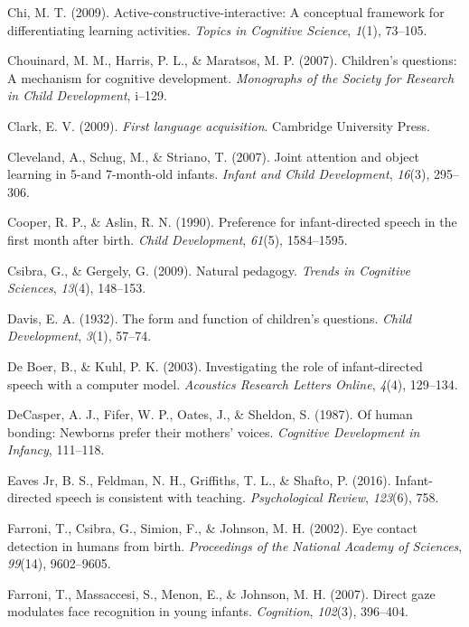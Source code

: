 \documentclass[a4paper,man,apacite,floatsintext]{apa6}
\begin{document}
\hypertarget{ref-chi2009active}{}
Chi, M. T. (2009). Active-constructive-interactive: A conceptual
framework for differentiating learning activities. \emph{Topics in
Cognitive Science}, \emph{1}(1), 73--105.

\hypertarget{ref-chouinard2007children}{}
Chouinard, M. M., Harris, P. L., \& Maratsos, M. P. (2007). Children's
questions: A mechanism for cognitive development. \emph{Monographs of
the Society for Research in Child Development}, i--129.

\hypertarget{ref-clark2009first}{}
Clark, E. V. (2009). \emph{First language acquisition}. Cambridge
University Press.

\hypertarget{ref-cleveland2007joint}{}
Cleveland, A., Schug, M., \& Striano, T. (2007). Joint attention and
object learning in 5-and 7-month-old infants. \emph{Infant and Child
Development}, \emph{16}(3), 295--306.

\hypertarget{ref-cooper1990preference}{}
Cooper, R. P., \& Aslin, R. N. (1990). Preference for infant-directed
speech in the first month after birth. \emph{Child Development},
\emph{61}(5), 1584--1595.

\hypertarget{ref-csibra2009natural}{}
Csibra, G., \& Gergely, G. (2009). Natural pedagogy. \emph{Trends in
Cognitive Sciences}, \emph{13}(4), 148--153.

\hypertarget{ref-davis1932form}{}
Davis, E. A. (1932). The form and function of children's questions.
\emph{Child Development}, \emph{3}(1), 57--74.

\hypertarget{ref-de2003investigating}{}
De Boer, B., \& Kuhl, P. K. (2003). Investigating the role of
infant-directed speech with a computer model. \emph{Acoustics Research
Letters Online}, \emph{4}(4), 129--134.

\hypertarget{ref-decasper1987human}{}
DeCasper, A. J., Fifer, W. P., Oates, J., \& Sheldon, S. (1987). Of
human bonding: Newborns prefer their mothers' voices. \emph{Cognitive
Development in Infancy}, 111--118.

\hypertarget{ref-eaves2016infant}{}
Eaves Jr, B. S., Feldman, N. H., Griffiths, T. L., \& Shafto, P. (2016).
Infant-directed speech is consistent with teaching. \emph{Psychological
Review}, \emph{123}(6), 758.

\hypertarget{ref-farroni2002eye}{}
Farroni, T., Csibra, G., Simion, F., \& Johnson, M. H. (2002). Eye
contact detection in humans from birth. \emph{Proceedings of the
National Academy of Sciences}, \emph{99}(14), 9602--9605.

\hypertarget{ref-farroni2007direct}{}
Farroni, T., Massaccesi, S., Menon, E., \& Johnson, M. H. (2007). Direct
gaze modulates face recognition in young infants. \emph{Cognition},
\emph{102}(3), 396--404.
\end{document}
